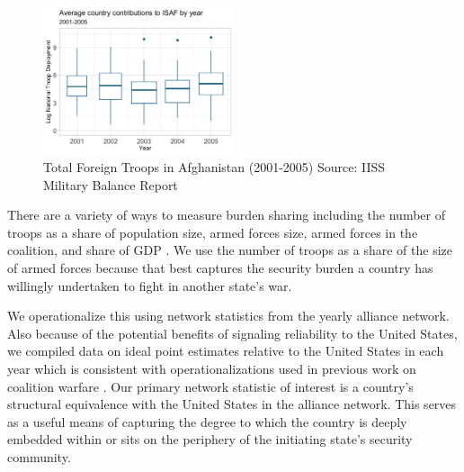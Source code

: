 \documentclass[12pt,letterpaper]{article}
\begin{document}
			\begin{figure}[H]
			\centering
				\includegraphics[width=0.5\textwidth]{figures/country_troop_boxplot.png}
			\caption{Total Foreign Troops in Afghanistan (2001-2005) Source: IISS Military Balance Report}
			\label{fig:afghan_total}
			\end{figure}

		There are a variety of ways to measure burden sharing including the number of troops as a share of population size, armed forces size, armed forces in the coalition, and share of GDP \citep{hartley_natoburdensharingfuture_1999}. We use the number of troops as a share of the size of armed forces because that best captures the security burden a country has willingly undertaken to fight in another state's war.
		
	
		We operationalize this using network statistics from the yearly alliance network. Also because of the potential benefits of signaling reliability to the United States, we compiled data on ideal point estimates relative to the United States in each year which is consistent with operationalizations used in previous work on coalition warfare \citep{wolford_politicsmilitarycoalitions_2015}. Our primary network statistic of interest is a country's structural equivalence with the United States in the alliance network. This serves as a useful means of capturing the degree to which the country is deeply embedded within or sits on the periphery of the initiating state's security community.
\end{document}
